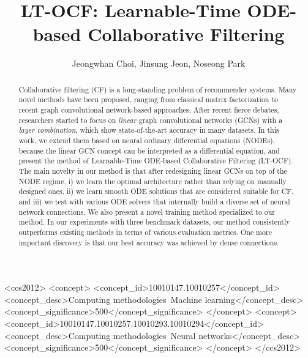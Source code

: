 \documentclass[sigconf]{acmart}
\begin{document}
\title{LT-OCF: Learnable-Time ODE-based Collaborative Filtering}
\author{Jeongwhan Choi, Jinsung Jeon, Noseong Park}

\renewcommand{\shortauthors}{Choi, et al.}

\begin{abstract}
Collaborative filtering (CF) is a long-standing problem of recommender systems. Many novel methods have been proposed, ranging from classical matrix factorization to recent graph convolutional network-based approaches. After recent fierce debates, researchers started to focus on \emph{linear} graph convolutional networks (GCNs) with a \emph{layer combination}, which show state-of-the-art accuracy in many datasets. In this work, we extend them based on neural ordinary differential equations (NODEs), because the linear GCN concept can be interpreted as a differential equation, and present the method of Learnable-Time ODE-based Collaborative Filtering (LT-OCF). The main novelty in our method is that after redesigning linear GCNs on top of the NODE regime, i) we learn the optimal architecture rather than relying on manually designed ones, ii) we learn smooth ODE solutions that are considered suitable for CF, and iii) we test with various ODE solvers that internally build a diverse set of neural network connections. We also present a novel training method specialized to our method. In our experiments with three benchmark datasets, our method consistently outperforms existing methods in terms of various evaluation metrics. One more important discovery is that our best accuracy was achieved by dense connections.
\end{abstract}

\begin{CCSXML}
<ccs2012>
<concept>
<concept_id>10010147.10010257</concept_id>
<concept_desc>Computing methodologies~Machine learning</concept_desc>
<concept_significance>500</concept_significance>
</concept>
<concept>
<concept_id>10010147.10010257.10010293.10010294</concept_id>
<concept_desc>Computing methodologies~Neural networks</concept_desc>
<concept_significance>500</concept_significance>
</concept>
</ccs2012>
\end{CCSXML}


\end{document}
